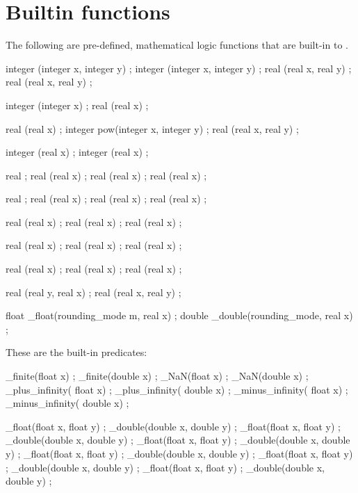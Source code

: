 \section{Builtin functions}
\label{sec:builtins}

The following are pre-defined, mathematical logic functions that are built-in
to \NAME.

\begin{listing-nonumber}
integer \min(integer x, integer y) ;
integer \max(integer x, integer y) ;
real \min(real x, real y) ;
real \max(real x, real y) ;

integer \abs(integer x) ;
real \abs(real x) ;

real \sqrt(real x) ;
integer pow(integer x, integer y) ;
real \pow(real x, real y) ;

integer \ceil(real x) ;
integer \floor(real x) ;

real \e ;
real \exp(real x) ;
real \log(real x) ;
real (real x) ;

real \pi ;
real \sin(real x) ;
real \cos(real x) ;
real \tan(real x) ;

real \cosh(real x) ;
real \sinh(real x) ;
real \tanh(real x) ;

real \asin(real x) ;
real \acos(real x) ;
real \atan(real x) ;

real \asinh(real x) ;
real \acosh(real x) ;
real \atanh(real x) ;

real (real y, real x) ;
real \hypot(real x, real y) ;

float \round_float(rounding_mode m, real x) ;
double \round_double(rounding_mode, real x) ;

\end{listing-nonumber}

These are the built-in predicates:
\begin{listing-nonumber}
 \is_finite(float x) ;
 \is_finite(double x) ;
 \is_NaN(float x) ;
 \is_NaN(double x) ;
 \is_plus_infinity( float x) ;
 \is_plus_infinity( double x) ;
 \is_minus_infinity( float x) ;
 \is_minus_infinity( double x) ;

 \eq_float(float x, float y) ;
 \eq_double(double x, double y) ;
 \gt_float(float x, float y) ;
 \gt_double(double x, double y) ;
 \ge_float(float x, float y) ;
 \ge_double(double x, double y) ;
 \lt_float(float x, float y) ;
 \lt_double(double x, double y) ;
 \le_float(float x, float y) ;
 \le_double(double x, double y) ;
 \ne_float(float x, float y) ;
 \ne_double(double x, double y) ;
 

\end{listing-nonumber}

